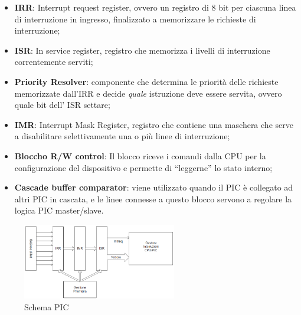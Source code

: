 \begin{itemize}
    \item \textbf{IRR}: Interrupt request register, ovvero un registro di 8 bit per ciascuna linea di interruzione in ingresso, finalizzato a memorizzare le richieste di interruzione;
    \item \textbf{ISR}: In service register, registro che memorizza i livelli di interruzione correntemente serviti;
    \item \textbf{Priority Resolver}: componente che determina le priorità delle richieste memorizzate dall'IRR e decide \textit{quale} istruzione deve essere servita, ovvero quale bit dell' ISR settare;
    \item \textbf{IMR}: Interrupt Mask Register, registro che contiene una maschera che serve a disabilitare selettivamente una o più linee di interruzione;
    \item \textbf{Bloccho R/W control}: Il blocco riceve i comandi dalla CPU per la configurazione del dispositivo e permette di “leggerne” lo stato interno;
    \item \textbf{Cascade buffer comparator}: viene utilizzato quando il PIC è collegato ad altri PIC in cascata, e le linee connesse a questo blocco servono a regolare la logica PIC master/slave.
\end{itemize}

\begin{figure}[ht]
    \centering
    \includegraphics[width=0.6\textwidth]{img/pic_operativo.png}
    \caption{Schema PIC}
    \label{fig:schema_pic}
\end{figure}

